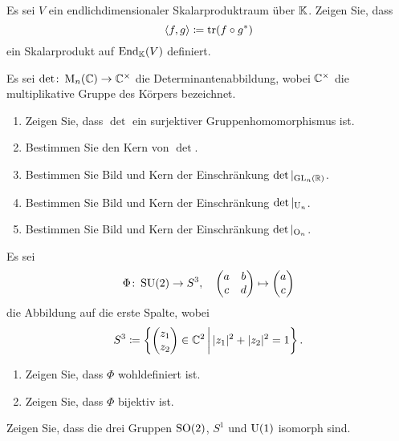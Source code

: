 \documentclass[a4paper,10pt]{scrartcl}
\begin{document}
\begin{question}
  Es sei $V$ ein endlichdimensionaler Skalarproduktraum über $\mathbb{K}$.
  Zeigen Sie, dass
  \[
    \langle f, g \rangle \coloneqq \operatorname{tr}(f \circ g^*)
  \]
  ein Skalarprodukt auf $\operatorname{End}_{\mathbb{K}}(V)$ definiert.
\end{question}


\begin{question}
  Es sei $\det \colon \operatorname{M}_n(\mathbb{C}) \to \mathbb{C}^\times$ die Determinantenabbildung, wobei $\mathbb{C}^\times$ die multiplikative Gruppe des Körpers bezeichnet.
  \begin{enumerate}[leftmargin=*]
    \item
      Zeigen Sie, dass $\det$ ein surjektiver Gruppenhomomorphismus ist.
    \item
      Bestimmen Sie den Kern von $\det$.
    \item
      Bestimmen Sie Bild und Kern der Einschränkung $\det|_{\operatorname{GL}_n(\mathbb{R})}$.
    \item
      Bestimmen Sie Bild und Kern der Einschränkung $\det|_{\operatorname{U}_n}$.
    \item
      Bestimmen Sie Bild und Kern der Einschränkung $\det|_{\operatorname{O}_n}$.
  \end{enumerate}
\end{question}


\begin{question}
  Es sei
  \[
    \Phi \colon \operatorname{SU}(2) \to S^3,
    \quad
    \begin{pmatrix}
      a & b \\
      c & d
    \end{pmatrix}
    \mapsto
    \begin{pmatrix} a \\ c \end{pmatrix}
  \]
  die Abbildung auf die erste Spalte, wobei
  \[
              S^3
    \coloneqq \left\{ \begin{pmatrix} z_1 \\ z_2 \end{pmatrix} \in \mathbb{C}^2 \,\middle|\, |z_1|^2 + |z_2|^2 = 1 \right\}.
  \]
  \begin{enumerate}[leftmargin=*]
    \item
      Zeigen Sie, dass $\Phi$ wohldefiniert ist.
    \item
      Zeigen Sie, dass $\Phi$ bijektiv ist.
  \end{enumerate}
\end{question}


\begin{question}
  Zeigen Sie, dass die drei Gruppen $\operatorname{SO}(2)$, $S^1$ und $\operatorname{U}(1)$ isomorph sind.
\end{question}
\end{document}
